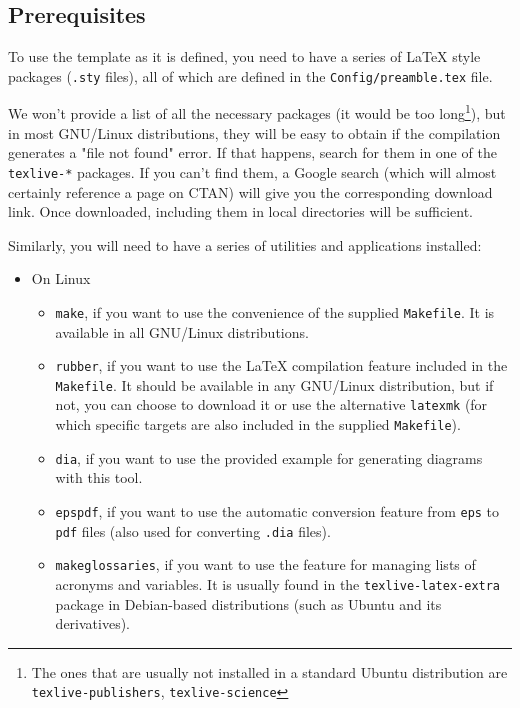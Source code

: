 {  \subsection{Prerequisites}
  \label{sec:prerequisites}

  To use the template as it is defined, you need to have a series of \LaTeX{} style packages (\texttt{.sty} files), all of which are defined in the \texttt{Config/preamble.tex} file.

  We won't provide a list of all the necessary packages (it would be too long\footnote{The ones that are usually not installed in a standard Ubuntu distribution are \texttt{texlive-publishers}, \texttt{texlive-science}}), but in most GNU/Linux distributions, they will be easy to obtain if the compilation generates a "file not found" error. If that happens, search for them in one of the \texttt{texlive-*} packages. If you can't find them, a Google search (which will almost certainly reference a page on CTAN) will give you the corresponding download link. Once downloaded, including them in local directories will be sufficient.

  Similarly, you will need to have a series of utilities and applications installed:

  \begin{itemize}
    \item On Linux

          \begin{itemize}
            \item \texttt{make}, if you want to use the convenience of the supplied \texttt{Makefile}. It is available in all GNU/Linux distributions.
            \item \texttt{rubber}, if you want to use the LaTeX compilation feature included in the \texttt{Makefile}. It should be available in any GNU/Linux distribution, but if not, you can choose to download it or use the alternative \texttt{latexmk} (for which specific targets are also included in the supplied \texttt{Makefile}).
            \item \texttt{dia}, if you want to use the provided example for generating diagrams with this tool.
            \item \texttt{epspdf}, if you want to use the automatic conversion feature from \texttt{eps} to \texttt{pdf} files (also used for converting \texttt{.dia} files).
            \item \texttt{makeglossaries}, if you want to use the feature for managing lists of acronyms and variables. It is usually found in the \texttt{texlive-latex-extra} package in Debian-based distributions (such as Ubuntu and its derivatives).
          \end{itemize}



\end{itemize}}
